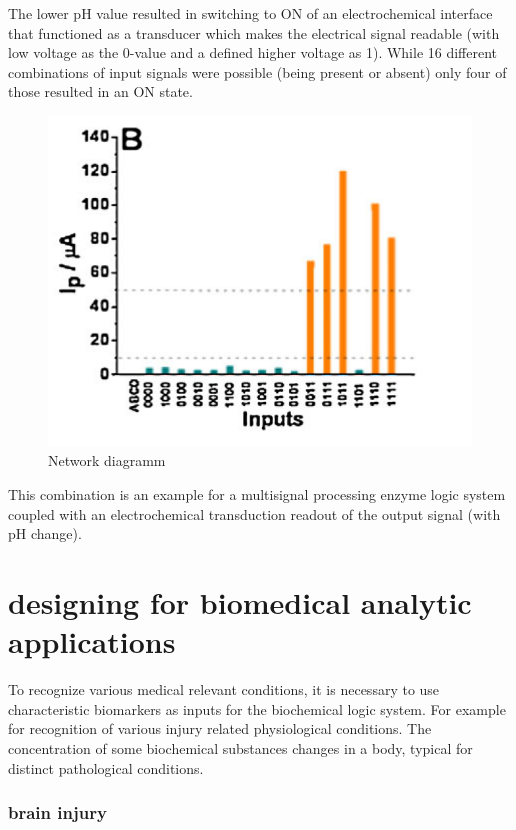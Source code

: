 \documentclass[runningheads]{llncs}
\begin{document}
		The lower pH value resulted in switching to ON of an electrochemical interface that functioned as a transducer which makes the electrical signal readable (with low voltage as the 0-value and a defined higher voltage as 1). While 16 different combinations of input signals were possible (being present or absent) only four of those resulted in an ON state.
		\begin{figure}[H] \centering \includegraphics[scale= 0.4]{pics/ph.png} \caption{Network diagramm} \label{img:ph} \end{figure}
	
	
		This combination is an example for a multisignal processing enzyme logic system coupled with an electrochemical transduction readout of the output signal (with pH change).



\section{designing for biomedical analytic applications}
	To recognize various medical relevant conditions, it is necessary to use characteristic biomarkers as inputs for the biochemical logic system. 
	For example for recognition of various injury related physiological conditions. The concentration of some biochemical substances changes in a body, typical for distinct pathological conditions.
	
	\subsubsection{brain injury}
	
\end{document}
